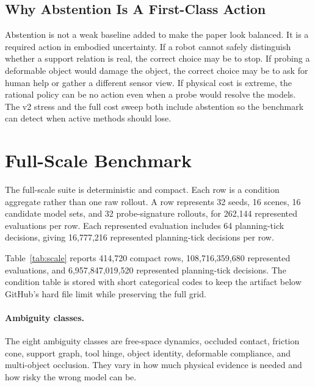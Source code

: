 \documentclass{article}
\begin{document}
\subsection{Why Abstention Is A First-Class Action}

Abstention is not a weak baseline added to make the paper look balanced. It is a required action in embodied uncertainty. If a robot cannot safely distinguish whether a support relation is real, the correct choice may be to stop. If probing a deformable object would damage the object, the correct choice may be to ask for human help or gather a different sensor view. If physical cost is extreme, the rational policy can be no action even when a probe would resolve the models. The v2 stress and the full cost sweep both include abstention so the benchmark can detect when active methods should lose.

\section{Full-Scale Benchmark}

The full-scale suite is deterministic and compact. Each row is a condition aggregate rather than one raw rollout. A row represents 32 seeds, 16 scenes, 16 candidate model sets, and 32 probe-signature rollouts, for 262,144 represented evaluations per row. Each represented evaluation includes 64 planning-tick decisions, giving 16,777,216 represented planning-tick decisions per row.

\begin{table}[t]
\centering
\small
\resizebox{\linewidth}{!}{}
\caption{Full-scale benchmark size. Rows are streamed to disk and summarized online to keep RAM use small.}
\label{tab:scale}
\end{table}

Table~\ref{tab:scale} reports 414,720 compact rows, 108,716,359,680 represented evaluations, and 6,957,847,019,520 represented planning-tick decisions. The condition table is stored with short categorical codes to keep the artifact below GitHub's hard file limit while preserving the full grid.

\paragraph{Ambiguity classes.}
The eight ambiguity classes are free-space dynamics, occluded contact, friction cone, support graph, tool hinge, object identity, deformable compliance, and multi-object occlusion. They vary in how much physical evidence is needed and how risky the wrong model can be.
\end{document}
